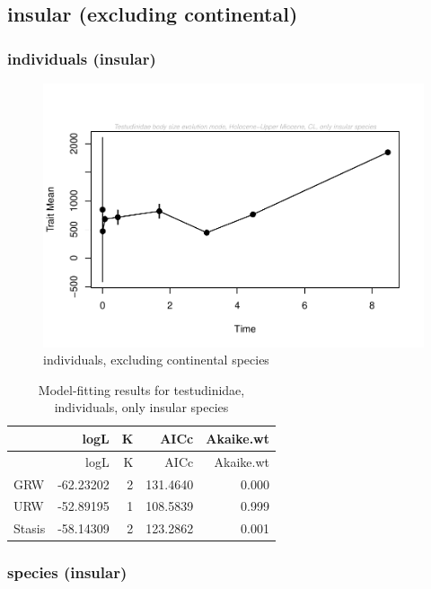 \documentclass[]{article}
\begin{document}
\newpage

\subsection{insular (excluding
continental)}\label{insular-excluding-continental}

\subsubsection{individuals (insular)}\label{individuals-insular}

\begin{figure}[htbp]
\centering
\includegraphics{MA_JJ_files/figure-latex/paleoTS, individuals, exluding continental species-1.pdf}
\caption{individuals, excluding continental species}
\end{figure}

\begin{longtable}[]{@{}lrrrr@{}}
\caption{Model-fitting results for testudinidae, individuals, only
insular species}\tabularnewline
\toprule
& logL & K & AICc & Akaike.wt\tabularnewline
\midrule
\endfirsthead
\toprule
& logL & K & AICc & Akaike.wt\tabularnewline
\midrule
\endhead
GRW & -62.23202 & 2 & 131.4640 & 0.000\tabularnewline
URW & -52.89195 & 1 & 108.5839 & 0.999\tabularnewline
Stasis & -58.14309 & 2 & 123.2862 & 0.001\tabularnewline
\bottomrule
\end{longtable}

\newpage

\subsubsection{species (insular)}\label{species-insular}
\end{document}
